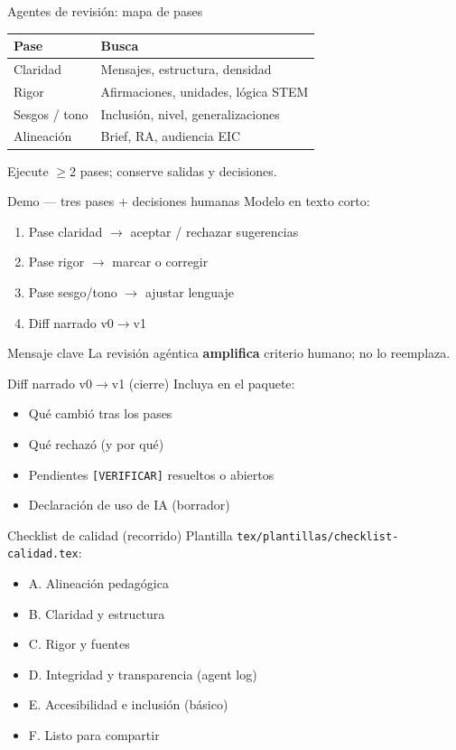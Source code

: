\documentclass[aspectratio=169,11pt]{beamer}
\begin{document}
\begin{frame}{Agentes de revisión: mapa de pases}
\begin{tabularx}{\textwidth}{@{}lX@{}}
\toprule
Pase & Busca \\
\midrule
Claridad & Mensajes, estructura, densidad \\
Rigor & Afirmaciones, unidades, lógica STEM \\
Sesgos / tono & Inclusión, nivel, generalizaciones \\
Alineación & Brief, RA, audiencia EIC \\
\bottomrule
\end{tabularx}
\vspace{0.5em}
Ejecute $\geq$2 pases; conserve salidas y decisiones.
\end{frame}

\begin{frame}{Demo --- tres pases + decisiones humanas}
Modelo en texto corto:
\begin{enumerate}
\item Pase claridad $\rightarrow$ aceptar / rechazar sugerencias
\item Pase rigor $\rightarrow$ marcar o corregir
\item Pase sesgo/tono $\rightarrow$ ajustar lenguaje
\item Diff narrado v0$\rightarrow$v1
\end{enumerate}
\begin{alertblock}{Mensaje clave}
La revisión agéntica \textbf{amplifica} criterio humano; no lo reemplaza.
\end{alertblock}
\end{frame}

\begin{frame}{Diff narrado v0$\rightarrow$v1 (cierre)}
Incluya en el paquete:
\begin{itemize}
\item Qué cambió tras los pases
\item Qué rechazó (y por qué)
\item Pendientes \texttt{[VERIFICAR]} resueltos o abiertos
\item Declaración de uso de IA (borrador)
\end{itemize}
\end{frame}

\begin{frame}{Checklist de calidad (recorrido)}
Plantilla \texttt{tex/plantillas/checklist-calidad.tex}:
\begin{itemize}
\item A. Alineación pedagógica
\item B. Claridad y estructura
\item C. Rigor y fuentes
\item D. Integridad y transparencia (agent log)
\item E. Accesibilidad e inclusión (básico)
\item F. Listo para compartir
\end{itemize}
\end{frame}
\end{document}
